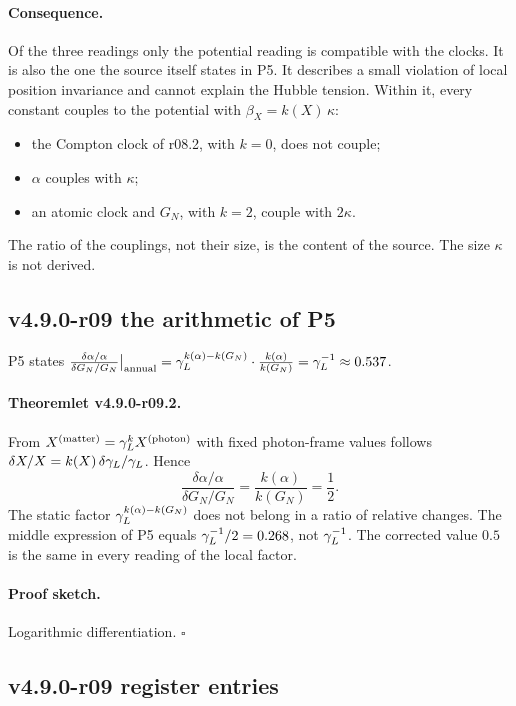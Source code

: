 \paragraph{Consequence.}
Of the three readings only the potential reading is compatible with the clocks.  It is also the one the source itself
states in P5.  It describes a small violation of local position invariance and cannot explain the Hubble tension.
Within it, every constant couples to the potential with \(\beta_X=k(X)\,\kappa\):
\begin{itemize}[leftmargin=2em]
\item the Compton clock of r08.2, with \(k=0\), does not couple;
\item \(\alpha\) couples with \(\kappa\);
\item an atomic clock and \(G_N\), with \(k=2\), couple with \(2\kappa\).
\end{itemize}
The ratio of the couplings, not their size, is the content of the source.  The size \(\kappa\) is not derived.

\subsection*{v4.9.0-r09 the arithmetic of P5}
\label{subsec:v490-r09-p5}

P5 states
\(\frac{\delta\alpha/\alpha}{\delta G_N/G_N}\big|_{\rm annual}=\gamma_L^{k(\alpha)-k(G_N)}\cdot\frac{k(\alpha)}{k(G_N)}=\gamma_L^{-1}\approx
0.537\).

\paragraph{Theoremlet v4.9.0-r09.2.}
From \(X^{(\mathrm{matter})}=\gamma_L^{k}X^{(\mathrm{photon})}\) with fixed photon-frame values follows
\(\delta X/X=k(X)\,\delta\gamma_L/\gamma_L\).  Hence
\[
\frac{\delta\alpha/\alpha}{\delta G_N/G_N}=\frac{k(\alpha)}{k(G_N)}=\frac12 .
\]
The static factor \(\gamma_L^{k(\alpha)-k(G_N)}\) does not belong in a ratio of relative changes.  The middle expression of P5
equals \(\gamma_L^{-1}/2=0.268\), not \(\gamma_L^{-1}\).  The corrected value \(0.5\) is the same in every reading of the local factor.

\paragraph{Proof sketch.}
Logarithmic differentiation.  \(\square\)

\subsection*{v4.9.0-r09 register entries}
\label{subsec:v490-r09-register}

